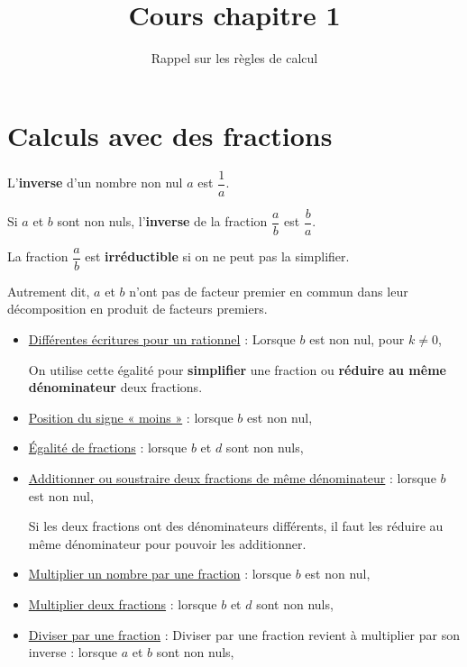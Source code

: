 \documentclass[a4paper,10pt]{article}
\title{Cours chapitre 1}
\author{Rappel sur les règles de calcul}
\date{}
\begin{document}
\maketitle

\section{Calculs avec des fractions}

\begin{definition}[Inverse]
	L’\textbf{inverse} d’un nombre non nul $a$ est $\dfrac{1}{a}$.

	Si $a$ et $b$ sont non nuls, l'\textbf{inverse} de la fraction $\dfrac{a}{b}$ est $\dfrac{b}{a}$.
\end{definition}

\begin{definition}
	La fraction $\dfrac{a}{b}$ est \textbf{irréductible} si on ne peut pas la simplifier.

	Autrement dit, $a$ et $b$ n’ont pas de facteur premier en commun dans leur décomposition en produit de facteurs premiers.
\end{definition}

\begin{itemize}
	\item \uline{Différentes écritures pour un rationnel} : Lorsque $b$ est non nul, pour $k ≠ 0$, 

	      On utilise cette égalité pour \textbf{simplifier} une fraction ou \textbf{réduire au même dénominateur} deux fractions.
	\item \uline{Position du signe « moins »} : lorsque $b$ est non nul, 
	\item \uline{Égalité de fractions} : lorsque $b$ et $d$ sont non nuls, 
	\item \uline{Additionner ou soustraire deux fractions de même dénominateur} : lorsque $b$ est non nul, 

	      Si les deux fractions ont des dénominateurs différents, il faut les réduire au même dénominateur pour pouvoir les
	      additionner.
	\item \uline{Multiplier un nombre par une fraction} : lorsque $b$ est non nul, 
	\item \uline{Multiplier deux fractions} : lorsque $b$ et $d$ sont non nuls, 
	\item \uline{Diviser par une fraction} : Diviser par une fraction revient à multiplier par son inverse : lorsque $a$ et $b$ sont non nuls, 
\end{itemize}
\end{document}

